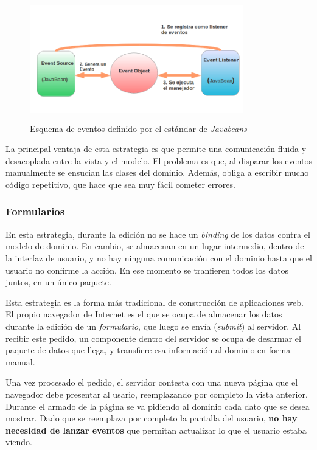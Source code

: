 	
	 \begin{figure}[h]
		\includegraphics[width=350px, height=200px]{img/javabeans}
		\caption{Esquema de eventos definido por el estándar de \emph{Javabeans}}
		\label{javabeans}
	\end{figure}

	La principal ventaja de esta estrategia es que
	permite una comunicación fluida y desacoplada entre la vista y el modelo.
	El problema es que, al disparar los eventos manualmente se ensucian las clases
	del dominio. Además, obliga a escribir mucho código repetitivo, que hace que
	sea muy fácil cometer errores.

\subsubsection{Formularios}
	En esta estrategia, durante la edición no se hace un \emph{binding} de los
	datos contra el modelo de dominio. En cambio, se almacenan en un lugar
	intermedio, dentro de la interfaz de usuario, y no hay ninguna comunicación
	con el dominio hasta que el usuario no confirme la acción. En ese momento se
	tranfieren todos los datos juntos, en un único paquete.
	
	Esta estrategia es la forma más tradicional de construcción de aplicaciones
	web. El propio navegador de Internet es el que se ocupa de almacenar los
	datos durante la edición de un \emph{formulario}, que luego se envía
	(\emph{submit}) al servidor. 
	Al recibir este pedido, un componente dentro del servidor se ocupa de desarmar
	el paquete de datos que llega, y transfiere esa información al dominio en forma
	manual.
	
	Una vez procesado el pedido, el servidor contesta con una nueva página que
	el navegador debe presentar al usario, reemplazando por completo la vista anterior.
	Durante el armado de la página se va pidiendo al dominio cada dato que se desea
	mostrar. Dado que se reemplaza por completo la pantalla del usuario, \textbf{no
	hay necesidad de lanzar eventos} que permitan actualizar lo que el usuario
	estaba viendo.
	
